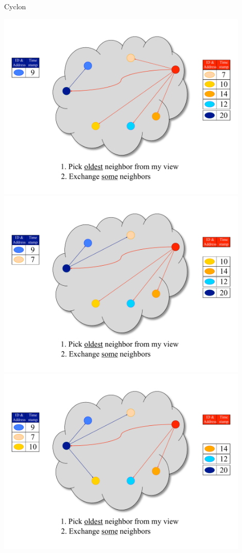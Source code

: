 \begin{frame}{Cyclon}
\begin{overprint}
\includegraphics[width=0.9\textwidth]{figs/11/7_cyclon}
\includegraphics[width=0.9\textwidth]{figs/11/8_cyclon}
\includegraphics[width=0.9\textwidth]{figs/11/9_cyclon}
\end{overprint}
\end{frame}


